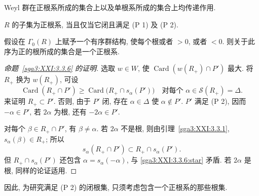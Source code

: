 \begin{corollary}\label{sga3:XXI:3.3.7}
Weyl 群在正根系所成的集合上以及单根系所成的集合上均传递作用.
\end{corollary}

\begin{corollary}\label{sga3:XXI:3.3.8}
\(R\) 的子集为正根系, 当且仅当它闭且满足 (P 1) 及 (P 2).
\end{corollary}

\begin{corollary}\label{sga3:XXI:3.3.9}
假设在 \(\Gamma_0(R)\) 上赋予一个有序群结构, 使每个根或者 \(>0\), 或者 \(<0\). 则关于此序为正的根所成的集合是一个正根系.
\end{corollary}

\begin{proof}[命题~\ref{sga3:XXI:3.3.6} 的证明]
选取 \(w\in W\), 使 \(\operatorname{Card}(w(R_+)\cap P')\) 最大. 将 \(R_+\) 换为 \(w(R_+)\), 可设
\begin{equation}
 \operatorname{Card}(R_+\cap P')
 \geq
 \operatorname{Card}\bigl(R_+\cap s_\alpha(P')\bigr)
 \quad\text{对每个 }\alpha\in\mathscr{S}(R_+)=\Delta.
 \tag{\(\ast\)}\label{sga3:XXI:3.3.6:star}
\end{equation}
来证明 \(R_+\subset P'\). 否则, 由于 \(P'\) 闭, 存在 \(\alpha\in\Delta\) 使 \(\alpha\notin P'\). \(P'\) 满足 (P 2), 因而 \(-\alpha\in P'\), 若 \(2\alpha\) 为根, 还有 \(-2\alpha\in P'\).

对每个 \(\beta\in R_+\cap P'\), 有 \(\beta\neq\alpha\). 若 \(2\alpha\) 不是根, 则由引理~\ref{sga3:XXI:3.3.1}, \(s_\alpha(\beta)\in R_+\); 所以
\[
 s_\alpha(R_+\cap P')
 \subset R_+\cap s_\alpha(P').
\]
但 \(R_+\cap s_\alpha(P')\) 还包含 \(\alpha=s_\alpha(-\alpha)\), 与 \eqref{sga3:XXI:3.3.6:star} 矛盾. 若 \(2\alpha\) 是根, 同样的论证适用.
\end{proof}

因此, 为研究满足 (P 2) 的闭根集, 只须考虑包含一个正根系的那些根集.

